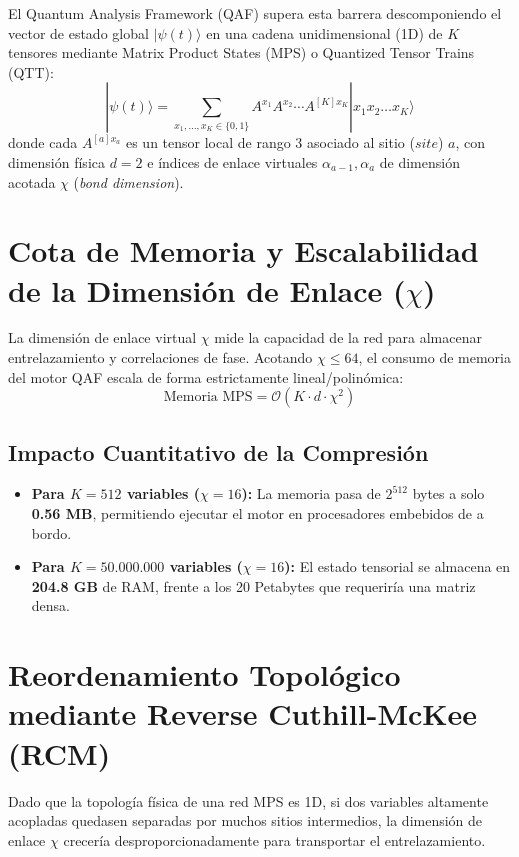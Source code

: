 \documentclass[11pt,a4paper,oneside]{report}
\begin{document}
El Quantum Analysis Framework (QAF) supera esta barrera descomponiendo el vector de estado global $|\psi(t)\rangle$ en una cadena unidimensional (1D) de $K$ tensores mediante Matrix Product States (MPS) o Quantized Tensor Trains (QTT):
\begin{equation}
|\psi(t)\rangle = \sum_{x_1, \dots, x_K \in \{0,1\}} A^{x_1} A^{x_2} \cdots A^{[K]x_K} |x_1 x_2 \dots x_K\rangle
\end{equation}
donde cada $A^{[a]x_a}$ es un tensor local de rango 3 asociado al sitio ($site$) $a$, con dimensión física $d = 2$ e índices de enlace virtuales $\alpha_{a-1}, \alpha_a$ de dimensión acotada $\chi$ (\emph{bond dimension}).

\section{Cota de Memoria y Escalabilidad de la Dimensión de Enlace ($\chi$)}
La dimensión de enlace virtual $\chi$ mide la capacidad de la red para almacenar entrelazamiento y correlaciones de fase. Acotando $\chi \le 64$, el consumo de memoria del motor QAF escala de forma estrictamente lineal/polinómica:
\begin{equation}
\text{Memoria MPS} = \mathcal{O}(K \cdot d \cdot \chi^2)
\end{equation}

\subsection{Impacto Cuantitativo de la Compresión}
\begin{itemize}
    \item \textbf{Para $K = 512$ variables ($\chi = 16$):} La memoria pasa de $2^{512}$ bytes a solo \textbf{0.56 MB}, permitiendo ejecutar el motor en procesadores embebidos de a bordo.
    \item \textbf{Para $K = 50.000.000$ variables ($\chi = 16$):} El estado tensorial se almacena en \textbf{204.8 GB} de RAM, frente a los 20 Petabytes que requeriría una matriz densa.
\end{itemize}

\section{Reordenamiento Topológico mediante Reverse Cuthill-McKee (RCM)}
Dado que la topología física de una red MPS es 1D, si dos variables altamente acopladas quedasen separadas por muchos sitios intermedios, la dimensión de enlace $\chi$ crecería desproporcionadamente para transportar el entrelazamiento.
\end{document}
